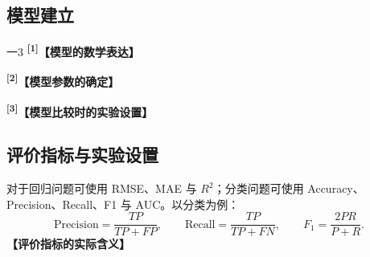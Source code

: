 \documentclass[UTF8,a4paper,12pt,fontset=fandol]{ctexart}
\newif\ifDraftAid
\newcommand{\ph}[1]{\textbf{\color{phg}【#1】}}
\newcommand{\detail}[1]{%
  \ifDraftAid\textnormal{\color{detailg}\small\,（参考写法：#1）}\fi}
\newcommand{\PHD}[2]{\ph{#1}\detail{#2}}
\newcommand{\SN}[1]{\textsuperscript{\color{noteg}\bfseries[#1]}}
\newcommand{\Note}[2]{\par\noindent\textbf{[#1]}\ #2}
\newcommand{\Annotated}[2]{%
\ifDraftAid
\noindent\begin{minipage}[t]{0.735\linewidth}\vspace{0pt}#1\end{minipage}\hfill
\begin{minipage}[t]{0.235\linewidth}\vspace{0pt}\footnotesize\color{noteg}\raggedright
\begin{tcolorbox}[colback=notebg,colframe=ruleg,boxrule=0.35pt,arc=1mm,left=1.2mm,right=1.2mm,top=1mm,bottom=1mm]
#2
\end{tcolorbox}\end{minipage}
\else
#1
\fi
}
\numberwithin{figure}{section}
\numberwithin{table}{section}
\begin{document}
\subsection{模型建立}
\Annotated{
一3
\SN{1}\PHD{模型的数学表达}{〔模型A〕是一种在〔任务类型〕中应用广泛的方法，通过〔核心机制〕实现〔目标任务〕，其基本原理是〔简述原理〕，原理如图〔编号〕所示。以〔主模型〕为例，记预测函数为 $g_\theta(\bm{x})$，其目标函数写为
\begin{equation}
\min_{\theta}\;J(\theta)=L_{\mathrm{fit}}(y,g_\theta(\bm{x}))+\lambda L_{\mathrm{reg}}(\theta),
\label{eq:baseobj}
\end{equation}
其中 $L_{\mathrm{fit}}$ 表示〔拟合或分类误差〕，$L_{\mathrm{reg}}$ 为〔正则项〕，用于减小模型过拟合。通过优化该目标函数，模型能够学习到〔输入与输出之间的映射关系〕。}

\par\medskip
\SN{2}\PHD{模型参数的确定}{在模型训练过程中，通过〔前向传播与反向传播或相应迭代过程〕不断调整和优化〔权重与参数〕，使得模型能够学习到输入数据和输出目标之间的映射关系。对于 $\lambda$ 及其他需要调节的参数，先在〔给定范围〕内设置若干候选值，再利用〔交叉验证或验证集〕比较模型表现，最终选取〔评价指标〕较优的一组参数。测试集仅用于最终结果评价。}

\par\medskip
\SN{3}\PHD{模型比较时的实验设置}{为使不同模型的结果具有可比性，各模型采用相同的〔训练集与测试集划分〕、相同的〔输入数据〕和相同的〔评价指标〕。对于需要单独标准化或变换的模型，其参数均由训练数据计算。}
}{
\Note{1}{模型章节除介绍算法名称外，还应给出与本题有关的主要公式或结构。}
\Note{2}{关键参数的选择方法和取值范围要交代清楚。}
\Note{3}{比较不同模型时保持数据划分和评价指标一致。}
}

\subsection{评价指标与实验设置}
对于回归问题可使用 RMSE、MAE 与 $R^2$；分类问题可使用 Accuracy、Precision、Recall、F1 与 AUC。以分类为例：
\begin{equation}
\mathrm{Precision}=\frac{TP}{TP+FP},\qquad
\mathrm{Recall}=\frac{TP}{TP+FN},\qquad
F_1=\frac{2PR}{P+R}.
\end{equation}
\PHD{评价指标的实际含义}{在实验设计方面，考虑到数据集规模及模型训练的稳定性，本文采用〔交叉验证〕的方法对各类模型进行评估：将原始数据集随机划分为〔数量〕个大小相等的子集，每一次实验选择其中一折作为测试集，其余作为训练集；为避免因类别分布不均衡而导致的训练偏差，在随机划分时采用了〔分层抽样〕的方式，保证每一折中的样本类别比例与整体数据集保持一致；最终结果取多次实验的平均值，以此减小因数据划分带来的偶然性影响，从而更加客观地评估模型性能。若〔各类别样本数量不均衡〕，仅使用〔单一指标〕可能不能完整反映模型表现，因此本文同时给出〔宏平均等综合指标〕。其中，〔选定的主要指标〕主要用于衡量〔本题最关心的性能〕。}
\end{document}
